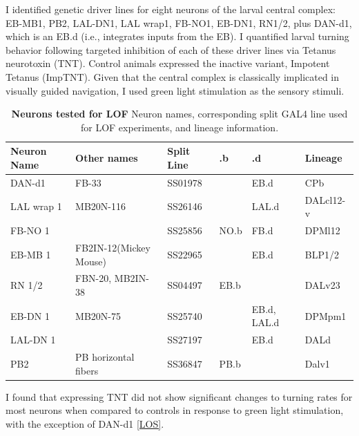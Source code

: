     I identified genetic driver lines for eight neurons of the larval central complex: EB-MB1, PB2, LAL-DN1, LAL wrap1, FB-NO1, EB-DN1, RN1/2, plus DAN-d1, which is an EB.d (i.e., integrates inputs from the EB). 
    I quantified larval turning behavior following targeted inhibition of each of these driver lines via Tetanus neurotoxin (TNT).
    Control animals expressed the inactive variant, Impotent Tetanus (ImpTNT).
    Given that the central complex is classically implicated in visually guided navigation, I used green light stimulation as the sensory stimuli.
     \begin{table}[H]
    \centering
    \begin{tabular}{llllll}
    \toprule
    \textbf{Neuron Name} & \textbf{Other names} & \textbf{Split Line} & \textbf{.b} & \textbf{.d} & \textbf{Lineage} \\ 
    \midrule
    DAN-d1      &   FB-33         & SS01978 &       & EB.d        & CPb        \\ 
    LAL wrap 1  & MB20N-116       & SS26146 &       & LAL.d       &  DALcl12-v  \\ 
    FB-NO 1     &                 & SS25856 & NO.b  & FB.d        &  DPMl12    \\ 
    EB-MB 1     & FB2IN-12(Mickey Mouse)& SS22965 &       & EB.d    & BLP1/2    \\ 
    RN 1/2      & FBN-20, MB2IN-38 & SS04497 & EB.b  &             &  DALv23    \\ 
    EB-DN 1     & MB20N-75        & SS25740 &       & EB.d, LAL.d & DPMpm1 \\ 
    LAL-DN 1    &                 & SS27197 &       & EB.d            & DALd   \\ 
    PB2         & PB horizontal fibers & SS36847 & PB.b      &             & Dalv1  \\ 
    \bottomrule
    \end{tabular}
    \caption{ \textbf{Neurons tested for LOF} Neuron names, corresponding split GAL4 line used for LOF experiments, and lineage information.}
    \end{table}

    I found that expressing TNT did not show significant changes to turning rates for most neurons when compared to controls in response to green light stimulation, with the exception of DAN-d1 \ref{LOS}. 


